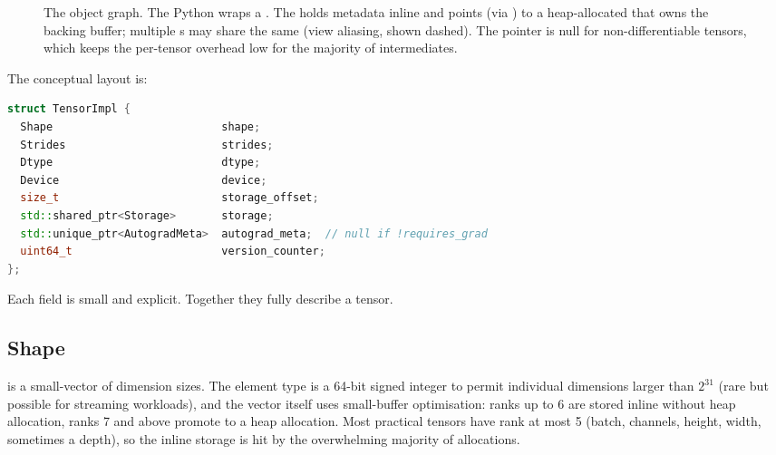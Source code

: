 \begin{figure}[t]
\begin{adjustbox}{max width=\textwidth, center}
\end{adjustbox}
\caption[Tensor object graph.]{The  object graph.
The Python  wraps a .
The  holds metadata inline and points (via
) to a heap-allocated  that owns
the backing buffer; multiple s may share the same
 (view aliasing, shown dashed). The
 pointer is null for non-differentiable tensors,
which keeps the per-tensor overhead low for the majority of
intermediates.}
\label{fig:tensor_model:layout}
\end{figure}

The conceptual layout is:

\begin{lstlisting}[style=lucidcpp,language=C++]
struct TensorImpl {
  Shape                          shape;
  Strides                        strides;
  Dtype                          dtype;
  Device                         device;
  size_t                         storage_offset;
  std::shared_ptr<Storage>       storage;
  std::unique_ptr<AutogradMeta>  autograd_meta;  // null if !requires_grad
  uint64_t                       version_counter;
};
\end{lstlisting}

Each field is small and explicit. Together they fully describe a
tensor.

\subsection{Shape}
\label{ssec:tensor_model:shape}

 is a small-vector of dimension sizes. The element type
is a 64-bit signed integer to permit individual dimensions larger
than \(2^{31}\) (rare but possible for streaming workloads), and
the vector itself uses small-buffer optimisation: ranks up to 6 are
stored inline without heap allocation, ranks 7 and above promote to
a heap allocation. Most practical tensors have rank at most 5
(batch, channels, height, width, sometimes a depth), so the inline
storage is hit by the overwhelming majority of allocations.

